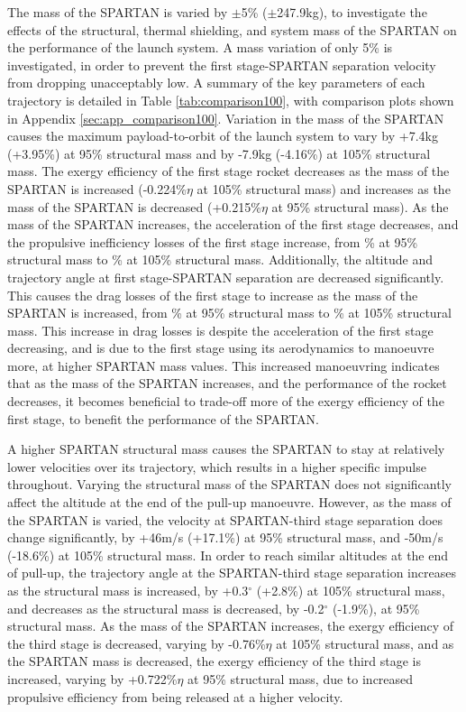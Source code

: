 The mass of the SPARTAN is varied by $\pm$5\% ($\pm$247.9kg), to investigate the effects of the structural, thermal shielding, and system mass of the SPARTAN on the performance of the launch system. A mass variation of only 5\% is investigated, in order to prevent the first stage-SPARTAN separation velocity from dropping unacceptably low. A summary of the key parameters of each trajectory is detailed in Table \ref{tab:comparison100}, with comparison plots shown in Appendix \ref{sec:app_comparison100}.
Variation in the mass of the SPARTAN causes the maximum payload-to-orbit of the launch system to vary by +7.4kg (+3.95\%) at 95\% structural mass and by -7.9kg (-4.16\%) at 105\% structural mass. 
The exergy efficiency of the first stage rocket decreases as the mass of the SPARTAN is increased (-0.224\%$\eta$  at 105\% structural mass) and increases as the mass of the SPARTAN is decreased (+0.215\%$\eta$  at 95\% structural mass). As the mass of the SPARTAN increases, the acceleration of the first stage decreases, and the propulsive inefficiency losses of the first stage increase, from \PlossoneCombinedmSPARTANNinetyFiveNoReturn\% at 95\% structural mass to \PlossoneCombinedmSPARTANOneHundredFiveNoReturn\% at 105\% structural mass.
Additionally, the altitude and trajectory angle at first stage-SPARTAN separation are decreased significantly. This causes the drag losses of the first stage to increase as the mass of the SPARTAN is increased, from \WDonemSPARTANNinetyFiveNoReturn\% at 95\% structural mass to \WDonemSPARTANOneHundredFiveNoReturn\% at 105\% structural mass. This increase in drag losses is despite the acceleration of the first stage decreasing, and is due to the first stage using its aerodynamics to manoeuvre more, at higher SPARTAN mass values.  
This increased manoeuvring indicates that as the mass of the SPARTAN increases, and the performance of the rocket decreases, it becomes beneficial to trade-off more of the exergy efficiency of the first stage, to benefit the performance of the SPARTAN. 

A higher SPARTAN structural mass causes the SPARTAN to stay at relatively lower velocities over its trajectory, which results in a higher specific impulse throughout. 
Varying the structural mass of the SPARTAN does not significantly affect the altitude at the end of the pull-up manoeuvre. However, as the mass of the SPARTAN is varied, the velocity at SPARTAN-third stage separation does change significantly, by +46m/s (+17.1\%) at 95\% structural mass, and -50m/s (-18.6\%) at 105\% structural mass. In order to reach similar altitudes at the end of pull-up, the trajectory angle at the SPARTAN-third stage separation increases as the structural mass is increased, by +0.3$^\circ$ (+2.8\%) at 105\% structural mass, and decreases as the structural mass is decreased, by -0.2$^\circ$ (-1.9\%), at 95\% structural mass. 
As the mass of the SPARTAN increases, the exergy efficiency of the third stage is decreased, varying by -0.76\%$\eta$ at 105\% structural mass, and as the SPARTAN mass is decreased, the exergy efficiency of the third stage is increased, varying by +0.722\%$\eta$ at 95\% structural mass, due to increased propulsive efficiency from being released at a higher velocity. 


